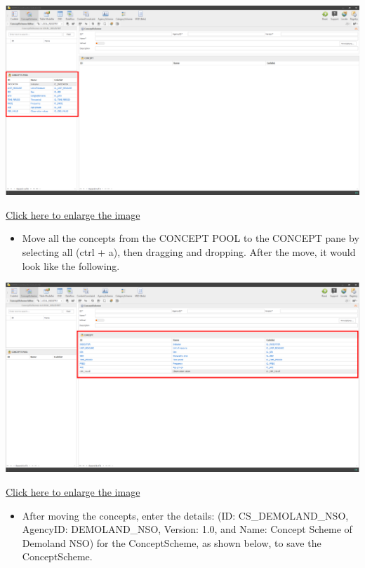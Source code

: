 \documentclass[
]{book}
\providecommand{\tightlist}{%
  \setlength{\itemsep}{0pt}\setlength{\parskip}{0pt}}
\begin{document}
\begin{center}\includegraphics[width=1\linewidth]{./images/image112} \end{center}

\href{images/image112.png}{Click here to enlarge the image}

\begin{itemize}
\tightlist
\item
  Move all the concepts from the CONCEPT POOL to the CONCEPT pane by selecting all (ctrl + a), then dragging and dropping. After the move, it would look like the following.
\end{itemize}

\begin{center}\includegraphics[width=1\linewidth]{./images/image114} \end{center}

\href{images/image114.png}{Click here to enlarge the image}

\begin{itemize}
\tightlist
\item
  After moving the concepts, enter the details: (ID: CS\_DEMOLAND\_NSO, AgencyID: DEMOLAND\_NSO, Version: 1.0, and Name: Concept Scheme of Demoland NSO) for the ConceptScheme, as shown below, to save the ConceptScheme.
\end{itemize}
\end{document}
